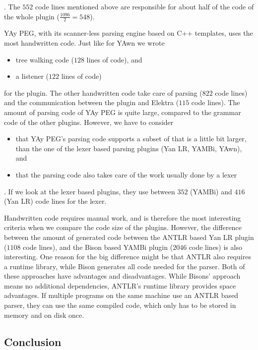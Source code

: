 . The $552$ code lines mentioned above are responsible for about half of the code of the whole plugin ($\frac{1096}{2} = 548$).

YAy PEG, with its scanner-less parsing engine based on C++ templates, uses the most handwritten code. Just like for YAwn we wrote

\begin{itemize}
  \item tree walking code ($128$ lines of code), and
  \item a listener ($122$ lines of code)
\end{itemize}

for the plugin. The other handwritten code take care of parsing ($822$ code lines) and the communication between the plugin and Elektra ($115$ code lines). The amount of parsing code of YAy PEG is quite large, compared to the grammar code of the other plugins. However, we have to consider

\begin{itemize}
  \item that YAy PEG’s parsing code supports a subset of  that is a little bit larger, than the one of the lexer based parsing plugins (Yan LR, YAMBi, YAwn), and
  \item that the parsing code also takes care of the work usually done by a lexer
\end{itemize}

. If we look at the lexer based plugins, they use between $352$ (YAMBi) and $416$ (Yan LR) code lines for the lexer.

Handwritten code requires manual work, and is therefore the most interesting criteria when we compare the code size of the plugins. However, the difference between the amount of generated code between the ANTLR based Yan LR plugin ($1108$ code lines), and the Bison based YAMBi plugin ($2046$ code lines) is also interesting. One reason for the big difference might be that ANTLR also requires a runtime library, while Bison generates all code needed for the parser. Both of these approaches have advantages and disadvantages. While Bisons’ approach means no additional dependencies, ANTLR’s runtime library provides space advantages. If multiple programs on the same machine use an ANTLR based parser, they can use the same compiled code, which only has to be stored in memory and on disk once.

\subsection{Conclusion}

